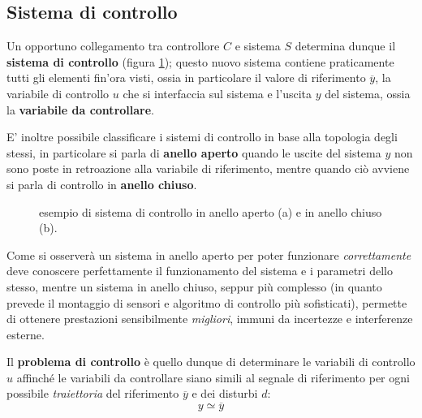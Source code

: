    \subsection{Sistema di controllo}
        \begin{concetto}
            Un opportuno collegamento tra controllore $C$ e sistema $S$ determina dunque il \textbf{sistema di controllo} (figura \ref{fig:sis:anelli}); questo nuovo sistema contiene praticamente tutti gli elementi fin'ora visti, ossia in particolare il valore di riferimento $\overline y$, la variabile di controllo $u$ che si interfaccia sul sistema e l'uscita $y$ del sistema, ossia la \textbf{variabile da controllare}.
            
            E' inoltre possibile classificare i sistemi di controllo in base alla topologia degli stessi, in particolare si parla di \textbf{anello aperto} quando le uscite del sistema $y$ non sono poste in retroazione alla variabile di riferimento, mentre quando ciò avviene si parla di controllo in \textbf{anello chiuso}.
        \end{concetto}
        
        \begin{figure}[bht]
        	\centering 
        	\begin{subfigure}{0.48\linewidth}
        		\centering
        		 \caption{}
        	\end{subfigure}
	        \begin{subfigure}{0.48\linewidth}
		        \centering
		         \caption{}
		    \end{subfigure}
	    	\caption{esempio di sistema di controllo in anello aperto (a) e in anello chiuso (b).}
	    	\label{fig:sis:anelli}
        \end{figure}
            	
        Come si osserverà un sistema in anello aperto per poter funzionare \textit{correttamente} deve conoscere perfettamente il funzionamento del sistema e i parametri dello stesso, mentre un sistema in anello chiuso, seppur più complesso (in quanto prevede il montaggio di sensori e algoritmo di controllo più sofisticati), permette di ottenere prestazioni sensibilmente \textit{migliori}, immuni da incertezze e interferenze esterne.
    	
    	\begin{concetto}
    		Il \textbf{problema di controllo} è quello dunque di determinare le variabili di controllo $u$ affinché le variabili da controllare siano simili al segnale di riferimento per ogni possibile \textit{traiettoria} del riferimento $\overline y$ e dei disturbi $d$:
    		\[ y\simeq \overline y \]
    	\end{concetto}
    
